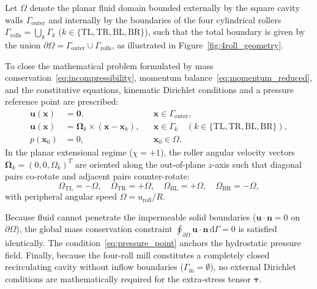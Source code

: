 Let $\Omega$ denote the planar fluid domain bounded
externally by the square cavity walls $\Gamma_{\mathrm{outer}}$ and internally by
the boundaries of the four cylindrical rollers $\Gamma_{\mathrm{rolls}} =
\bigcup_{k} \Gamma_k$ ($k \in \{\mathrm{TL}, \mathrm{TR}, \mathrm{BL},
\mathrm{BR}\}$), such that the total boundary is given by the union
$\partial\Omega = \Gamma_{\mathrm{outer}} \cup \Gamma_{\mathrm{rolls}}$, as
illustrated in Figure~\ref{fig:4roll_geometry}.

To close the mathematical problem formulated by mass
conservation~\eqref{eq:incompressibility}, momentum balance~\eqref{eq:momentum_reduced},
and the constitutive equations, kinematic Dirichlet conditions and a pressure reference
point are prescribed:
\begin{align}
    \boldsymbol{u}(\boldsymbol{x}) &= \boldsymbol{0}, 
        && \boldsymbol{x} \in \Gamma_{\mathrm{outer}}, \label{eq:bc_outer_walls} \\
    \boldsymbol{u}(\boldsymbol{x}) &= \boldsymbol{\Omega}_k \times (\boldsymbol{x} - \boldsymbol{x}_k), 
        && \boldsymbol{x} \in \Gamma_k \quad (k \in \{\mathrm{TL}, \mathrm{TR}, \mathrm{BL}, \mathrm{BR}\}), \label{eq:bc_velocity_rolls} \\
    p(\boldsymbol{x}_0) &= 0, 
        && \boldsymbol{x}_0 \in \Omega . \label{eq:pressure_point}
\end{align}
In the planar extensional regime ($\chi = +1$), the roller angular velocity
vectors $\boldsymbol{\Omega}_k = (0, 0, \Omega_k)^T$ are oriented along the
out-of-plane $z$-axis such that diagonal pairs co-rotate and adjacent pairs
counter-rotate:
\begin{equation}
    \Omega_{\mathrm{TL}} = -\Omega, \quad \Omega_{\mathrm{TR}} = +\Omega, \quad
    \Omega_{\mathrm{BL}} = +\Omega, \quad \Omega_{\mathrm{BR}} = -\Omega ,
\end{equation}
with peripheral angular speed $\Omega = u_{\mathrm{roll}} / R$.

Because fluid cannot penetrate the impermeable solid boundaries ($\boldsymbol{u}
\cdot \boldsymbol{n} = 0$ on $\partial\Omega$), the global mass conservation
constraint $\oint_{\partial\Omega} \boldsymbol{u} \cdot \boldsymbol{n} \,
\mathrm{d}\Gamma = 0$ is satisfied identically. 
The condition~\eqref{eq:pressure_point} anchors the hydrostatic pressure
field. Finally, because the four-roll mill constitutes a completely closed
recirculating cavity without inflow boundaries ($\Gamma_{\mathrm{in}} =
\emptyset$), no external Dirichlet conditions are mathematically required 
for the extra-stress tensor $\boldsymbol{\tau}$.